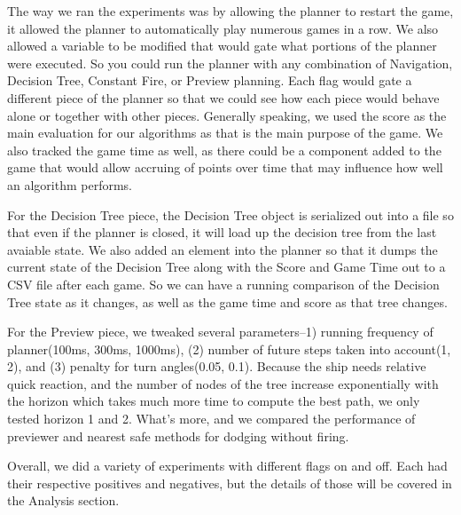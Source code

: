 \documentclass[10pt,final,conference]{IEEEtran}
\begin{document}
The way we ran the experiments was by allowing the planner to restart the game, it allowed the planner to automatically play numerous games in a row.  We also allowed a variable to be modified that would gate what portions of the planner were executed.  So you could run the planner with any combination of Navigation, Decision Tree, Constant Fire, or Preview planning.  Each flag would gate a different piece of the planner so that we could see how each piece would behave alone or together with other pieces.  Generally speaking, we used the score as the main evaluation for our algorithms as that is the main purpose of the game.  We also tracked the game time as well, as there could be a component added to the game that would allow accruing of points over time that may influence how well an algorithm performs.

For the Decision Tree piece, the Decision Tree object is serialized out into a file so that even if the planner is closed, it will load up the decision tree from the last avaiable state.  We also added an element into the planner so that it dumps the current state of the Decision Tree along with the Score and Game Time out to a CSV file after each game.  So we can have a running comparison of the Decision Tree state as it changes, as well as the game time and score as that tree changes.

For the Preview piece, we tweaked several parameters--1) running frequency of planner(100ms, 300ms, 1000ms), (2) number of future steps taken into account(1, 2), and (3) penalty for turn angles(0.05, 0.1). Because the ship needs relative quick reaction, and the number of nodes of the tree increase exponentially with the horizon which takes much more time to compute the best path, we only tested horizon 1 and 2. What's more, and we compared the performance of previewer and nearest safe methods for dodging without firing.

Overall, we did a variety of experiments with different flags on and off.  Each had their respective positives and negatives, but the details of those will be covered in the Analysis section.
\end{document}
